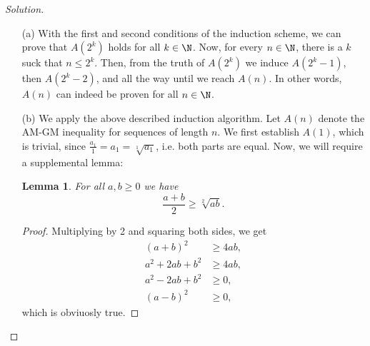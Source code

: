 \documentclass[a4paper, 12pt]{article}
\theoremstyle{plain}
\newtheorem{lemma}{Lemma}
\begin{document}
\begin{proof}[Solution]~
    \begin{itemize}
        \item[(a)]
            With the first and second conditions of the induction scheme, we can prove that $A(2^k)$ holds for all $k \in \N$. Now, for every $n \in \N$, there is a $k$ suck that $n \leqslant 2^k$. Then, from the truth of $A(2^k)$ we induce $A(2^k-1)$, then $A(2^k - 2)$, and all the way until we reach $A(n)$. In other words, $A(n)$ can indeed be proven for all $n \in \N$.
        \item[(b)]
            We apply the above described induction algorithm. Let $A(n)$ denote the AM-GM inequality for sequences of length $n$. We first establish $A(1)$, which is trivial, since $\frac{a_1}{1} = a_1 = \sqrt[1]{a_1}$, i.e. both parts are equal. Now, we will require a supplemental lemma:
            \begin{lemma} \label{amgm}
                For all $a, b \geqslant 0$ we have
                \[ \frac{a+b}{2} \geqslant \sqrt[2]{ab}. \] 
            \end{lemma}
            \begin{proof}
                Multiplying by 2 and squaring both sides, we get
                \begin{align*}
                    (a + b)^2 &\geqslant 4ab,\\
                    a^2 + 2ab + b^2 &\geqslant 4ab,\\
                    a^2 - 2ab + b^2 &\geqslant 0,\\
                    (a-b)^2 &\geqslant 0,
                \end{align*}
                which is obviuosly true.
            \end{proof}


\end{itemize}
\end{proof}
\end{document}
